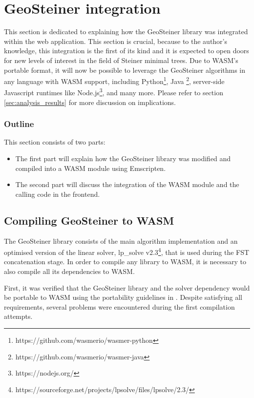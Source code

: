 \documentclass{l4proj}
\begin{document}
\section{GeoSteiner integration}
\label{sec:geosteiner_integration}
This section is dedicated to explaining how the GeoSteiner library was integrated within the web application. This section is crucial, because to the author's knowledge, this integration is the first of its kind and it is expected to open doors for new levels of interest in the field of Steiner minimal trees. Due to WASM's portable format, it will now be possible to leverage the GeoSteiner algorithms in any language with WASM support, including Python\footnote{https://github.com/wasmerio/wasmer-python}, Java \footnote{https://github.com/wasmerio/wasmer-java}, server-side Javascript runtimes like Node.js\footnote{https://nodejs.org/}, and many more. Please refer to section \ref{sec:analysis_results} for more discussion on implications.

\subsubsection{Outline}
This section consists of two parts:
\begin{itemize}
    \item The first part will explain how the GeoSteiner library was modified and compiled into a WASM module using Emscripten.
    \item The second part will discuss the integration of the WASM module and the calling code in the frontend.
\end{itemize}

\subsection{Compiling GeoSteiner to WASM}

The GeoSteiner library consists of the main algorithm implementation and an optimised version of the linear solver, lp\_solve v2.3\footnote{https://sourceforge.net/projects/lpsolve/files/lpsolve/2.3/}, that is used during the FST concatenation stage.
In order to compile any library to WASM, it is necessary to also compile all its dependencies to WASM.

First, it was verified that the GeoSteiner library and the solver dependency would be portable to WASM using the portability guidelines in \cite{Emscripten_portability}.
Despite satisfying all requirements, several problems were encountered during the first compilation attempts.
\end{document}
